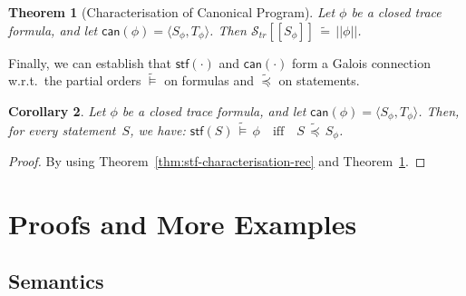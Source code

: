 \documentclass[10pt,a4paper]{amsart}
\newtheorem{theorem}{Theorem}[section]
\newtheorem{corollary}[theorem]{Corollary}
\theoremstyle{definition}
\newcommand{\denot}[1]{\left[\!\left[#1\right]\!\right]}
\newcommand{\fdenot}[1]{\left|\!\left|#1\right|\!\right|}
\newcommand{\trcdenot}[1]{\mathcal{S}_{\mathit{tr}}\!\denot{#1}}
\newcommand{\stfs}[1]{\mathsf{stf} (#1)}
\newcommand{\can}[1]{\mathsf{can} (#1)}
\newcommand{\Rec}{\mbox{\bf Rec}}
\begin{document}
\begin{theorem}[Characterisation of Canonical Program]
\label{thm:can-characterisation-rec}
  Let $\phi$ be a closed trace formula, and let
  $\can{\phi}=\langle S_\phi,T_\phi\rangle$.
  Then
  $\trcdenot{S_\phi} \,\widetilde{=}\, \fdenot{\phi}$.
\end{theorem}

Finally, we can establish that $\stfs{\cdot}$ and $\can{\cdot}$ form
a Galois connection w.r.t.\ the partial orders $\widetilde{\models}$ 
on formulas and $\widetilde{\preceq}$ on statements.

\begin{corollary}
\label{cor:can}
  Let $\phi$ be a closed trace formula, and let
  $\can{\phi}=\langle S_\phi,T_\phi\rangle$. Then,
  for every statement~$S$, we have:
  $ \stfs{S} \,\widetilde{\models}\, \phi
     \quad\text{iff}\quad
     S \,\widetilde{\preceq}\, S_\phi $.
\end{corollary}

\begin{proof}
  By using Theorem~\ref{thm:stf-characterisation-rec}
  and Theorem~\ref{thm:can-characterisation-rec}. 
\end{proof}



\appendix

\section{Proofs and More Examples}

\subsection{Semantics}
\label{sec:semantics-app}
\end{document}

